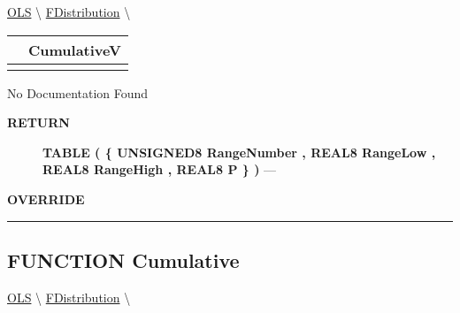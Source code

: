 \hypertarget{ecldoc:linearregression.ols.distributionbase.cumulativev}{}
\hspace{0pt} \hyperlink{ecldoc:linearregression.ols}{OLS} \textbackslash 
\hspace{0pt} \hyperlink{ecldoc:linearregression.ols.fdistribution}{FDistribution} \textbackslash 

{\renewcommand{\arraystretch}{1.5}
\begin{tabularx}{\textwidth}{|>{\raggedright\arraybackslash}l|X|}
\hline
\hspace{0pt}\mytexttt{\color{red} } & \textbf{CumulativeV} \\
\hline
\multicolumn{2}{|>{\raggedright\arraybackslash}X|}{\hspace{0pt}\mytexttt{\color{param} ()}} \\
\hline
\end{tabularx}
}

\par





No Documentation Found








\par
\begin{description}
\item [\colorbox{tagtype}{\color{white} \textbf{\textsf{RETURN}}}] \textbf{TABLE ( \{ UNSIGNED8 RangeNumber , REAL8 RangeLow , REAL8 RangeHigh , REAL8 P \} )} --- 
\end{description}






\par
\begin{description}
\item [\colorbox{tagtype}{\color{white} \textbf{\textsf{OVERRIDE}}}] 
\end{description}



\rule{\linewidth}{0.5pt}
\subsection*{\textsf{\colorbox{headtoc}{\color{white} FUNCTION}
Cumulative}}

\hypertarget{ecldoc:linearregression.ols.distributionbase.cumulative}{}
\hspace{0pt} \hyperlink{ecldoc:linearregression.ols}{OLS} \textbackslash 
\hspace{0pt} \hyperlink{ecldoc:linearregression.ols.fdistribution}{FDistribution} \textbackslash 

